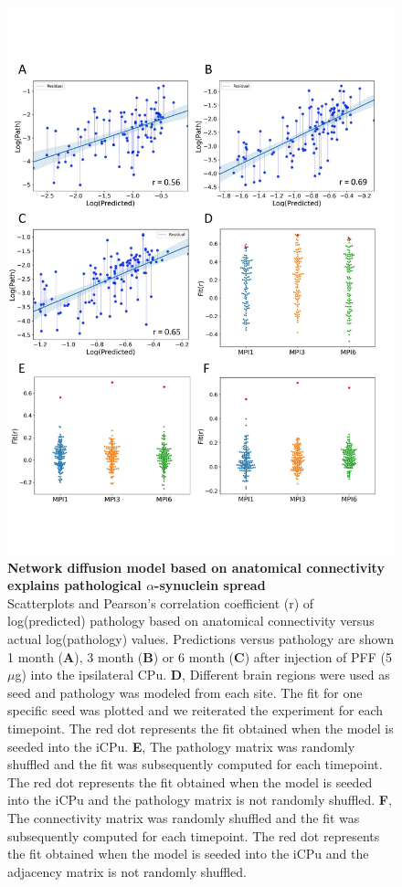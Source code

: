 \begin{figure}[h]
 
    \includegraphics[width = \linewidth]{Figures/Fig1.pdf}
    \centering
    \caption{\textbf{Network diffusion model based on anatomical connectivity explains pathological $\alpha$-synuclein spread}\\
    \label{fig:fig1}
    Scatterplots and Pearson's correlation coefficient (r) of log(predicted) pathology based on anatomical connectivity versus actual log(pathology) values. Predictions versus pathology are shown 1 month (\textbf{A}), 3 month (\textbf{B}) or 6 month (\textbf{C}) after injection of PFF (5$\mu$g) into the ipsilateral CPu.
    \textbf{D}, Different brain regions were used as seed and pathology was modeled from each site. The fit for one specific seed was plotted and we reiterated the experiment for each timepoint. The red dot represents the fit obtained when the model is seeded into the iCPu. \textbf{E}, The pathology matrix was randomly shuffled and the fit was subsequently computed for each timepoint. The red dot represents the fit obtained when the model is seeded into the iCPu and the pathology matrix is not randomly shuffled. \textbf{F}, The connectivity matrix was randomly shuffled and the fit was subsequently computed for each timepoint. The red dot represents the fit obtained when the model is seeded into the iCPu and the adjacency matrix is not randomly shuffled.}
    
\end{figure}
    
